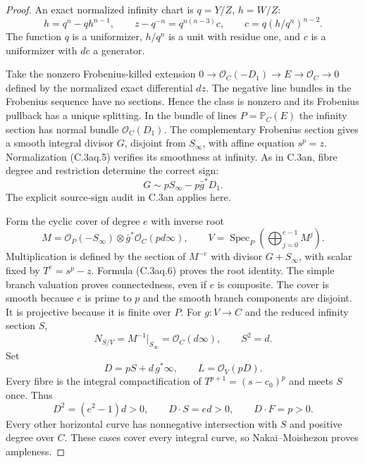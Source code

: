 \begin{proof}
An exact normalized infinity chart is $q=Y/Z$, $h=W/Z$:
\[
 h=q^n-qh^{n-1},\qquad
 z-q^{-n}=q^{n(n-3)}c,\qquad
 c=q(h/q^n)^{n-2}.
                                                        \tag{C.3aq.5}
\]
The function $q$ is a uniformizer, $h/q^n$ is a unit
with residue one, and $c$ is a uniformizer with $dc$
a generator.

Take the nonzero Frobenius-killed extension
$0\to\mathcal O_C(-D_1)\to E\to\mathcal O_C\to0$
defined by the normalized exact differential $dz$.
The negative line bundles in the Frobenius sequence
have no sections. Hence the class is nonzero and its
Frobenius pullback has a unique splitting.
In the bundle of lines $P=\mathbb P_C(E)$ the infinity
section has normal bundle $\mathcal O_C(D_1)$.
The complementary Frobenius section gives a smooth
integral divisor $G$, disjoint from $S_\infty$, with
affine equation $s^p=z$. Normalization (C.3aq.5)
verifies its smoothness at infinity. As in C.3an,
fibre degree and restriction determine the correct sign:
\[
                   G\sim pS_\infty-p\bar g^*D_1.
                                                        \tag{C.3aq.6}
\]
The explicit source-sign audit in C.3an applies here.

Form the cyclic cover of degree $e$ with inverse root
\[
 M=\mathcal O_P(-S_\infty)\otimes
                          \bar g^*\mathcal O_C(pd\infty),
 \qquad V=\operatorname{Spec}_P\left(\bigoplus_{j=0}^{e-1}M^j\right).
                                                        \tag{C.3aq.7}
\]
Multiplication is defined by the section of $M^{-e}$
with divisor $G+S_\infty$, with scalar fixed by
$T^e=s^p-z$. Formula (C.3aq.6) proves the root identity.
The simple branch valuation proves connectedness, even
if $e$ is composite. The cover is smooth because $e$
is prime to $p$ and the smooth branch components are
disjoint. It is projective because it is finite over $P$.
For $g:V\to C$ and the reduced infinity section $S$,
\[
 N_{S/V}=M^{-1}|_{S_\infty}=\mathcal O_C(d\infty),\qquad S^2=d.
\]
Set
\[
                   D=pS+d\,g^*\infty,\qquad L=\mathcal O_V(pD).
                                                        \tag{C.3aq.8}
\]
Every fibre is the integral compactification of
$T^{p+1}=(s-c_0)^p$ and meets $S$ once. Thus
\[
 D^2=(e^2-1)d>0,\qquad D\cdot S=ed>0,\qquad D\cdot F=p>0.
\]
Every other horizontal curve has nonnegative intersection
with $S$ and positive degree over $C$. These cases cover
every integral curve, so Nakai--Moishezon proves ampleness.


\end{proof}
